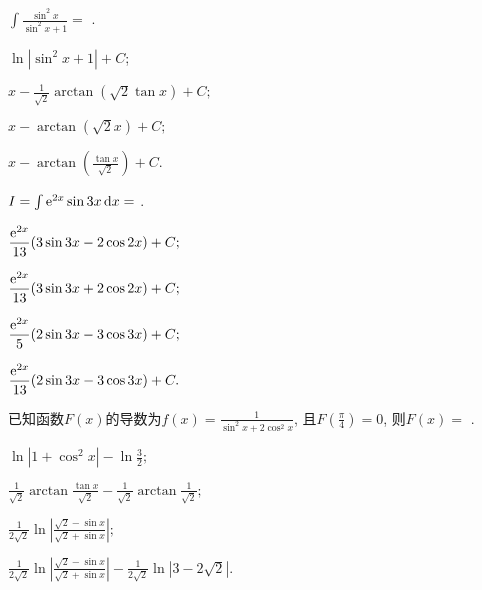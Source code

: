 \begin{problem} $\displaystyle \int \frac{\sin^2 x}{\sin^2 x +1}= $ .

\begin{abcd} \item $\displaystyle \ln|\sin^2 x + 1|+ C$;

\item $\displaystyle x - \frac{1}{\sqrt{2}}{\arctan}(\sqrt{2}\tan x) + C;$

\item $\displaystyle x - \arctan(\sqrt{2}x) + C;$

\item $\displaystyle x - \arctan\left( \frac{\tan x}{\sqrt{2}} \right) + C.$

\end{abcd}

\end{problem}           

\begin{problem} $I = \int {\mathrm{e}^{2x}\sin 3x\mathop{}\!\mathrm{d}x=}$ .

\begin{abcd} \item $\displaystyle \frac{\mathrm{e}^{2x}}{13}(3\sin 3x - 2\cos 2x) + C;$

\item $\displaystyle \frac{\mathrm{e}^{2x}}{13}(3\sin 3x + 2\cos 2x) + C;$

\item $\displaystyle \frac{\mathrm{e}^{2x}}{5}(2\sin 3x - 3\cos 3x) + C;$

\item $\displaystyle \frac{\mathrm{e}^{2x}}{13}(2\sin 3x - 3\cos 3x) + C.$

\end{abcd}

\end{problem}           


\begin{problem}
已知函数$F(x)$的导数为$\displaystyle f(x) = \frac{1}{\sin^{2}x + 2\cos^{2}x}$, 且$\displaystyle F(\frac{\pi}{4}) = 0$, 则$F(x) =$
.

\begin{abcd} 
	\item $\displaystyle \ln\left| 1 + \cos^{2}x \right| - \ln\frac{3}{2};$

\item
$\displaystyle \frac{1}{\sqrt{2}}\arctan\frac{\tan x}{\sqrt{2}} - \frac{1}{\sqrt{2}}\arctan\frac{1}{\sqrt{2}};$

\item
$\displaystyle \frac{1}{2\sqrt{2}}\ln\left| \frac{\sqrt{2} - \sin x}{\sqrt{2} + \sin x} \right|; $

\item
$\displaystyle \frac{1}{2\sqrt{2}}\ln\left| \frac{\sqrt{2} - \sin x}{\sqrt{2} + \sin x} \right| - \frac{1}{2\sqrt{2}}\ln\left| 3 - 2\sqrt{2} \right|.$

\end{abcd}

\end{problem}   


